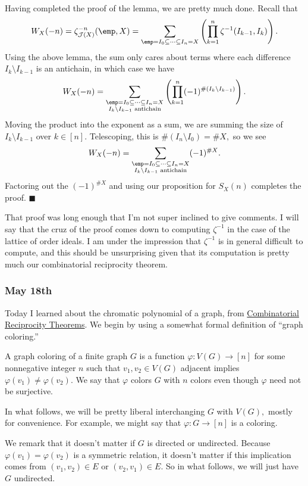 Having completed the proof of the lemma, we are pretty much done. Recall that
\[W_X(-n)=\zeta_{\mathcal J(X)}^{-n}(\emp,X)=\sum_{\emp=I_0\subseteq\cdots\subseteq I_n=X}\left(\prod_{k=1}^n\zeta^{-1}(I_{k-1},I_k)\right).\]
Using the above lemma, the sum only cares about terms where each difference $I_k\setminus I_{k-1}$ is an antichain, in which case we have
\[W_X(-n)=\sum_{\substack{\emp=I_0\subseteq\cdots\subseteq I_n=X\\I_k\setminus I_{k-1}\text{ antichain}}}\left(\prod_{k=1}^n(-1)^{\#(I_k\setminus I_{k-1})}\right).\]
Moving the product into the exponent as a sum, we are summing the size of $I_k\setminus I_{k-1}$ over $k\in[n].$ Telescoping, this is $\#(I_n\setminus I_0)=\#X,$ so we see
\[W_X(-n)=\sum_{\substack{\emp=I_0\subseteq\cdots\subseteq I_n=X\\I_k\setminus I_{k-1}\text{ antichain}}}(-1)^{\#X}.\]
Factoring out the $(-1)^{\#X}$ and using our proposition for $S_X(n)$ completes the proof. $\blacksquare$

That proof was long enough that I'm not super inclined to give comments. I will say that the cruz of the proof comes down to computing $\zeta^{-1}$ in the case of the lattice of order ideals. I am under the impression that $\zeta^{-1}$ is in general difficult to compute, and this should be unsurprising given that its computation is pretty much our combinatorial reciprocity theorem.

\subsubsection{May 18th}
Today I learned about the chromatic polynomial of a graph, from \href{https://web.archive.org/web/20201112023302/http://math.sfsu.edu/beck/papers/crt.pdf}{Combinatorial Reciprocity Theorems}. We begin by using a somewhat formal definition of ``graph coloring.''
\begin{definition}
    A graph coloring of a finite graph $G$ is a function $\varphi:V(G)\to[n]$ for some nonnegative integer $n$ such that $v_1,v_2\in V(G)$ adjacent implies $\varphi(v_1)\ne\varphi(v_2).$ We say that $\varphi$ colors $G$ with $n$ colors even though $\varphi$ need not be surjective.
\end{definition}
In what follows, we will be pretty liberal interchanging $G$ with $V(G),$ mostly for convenience. For example, we might say that $\varphi:G\to[n]$ is a coloring.

We remark that it doesn't matter if $G$ is directed or undirected. Because $\varphi(v_1)=\varphi(v_2)$ is a symmetric relation, it doesn't matter if this implication comes from $(v_1,v_2)\in E$ or $(v_2,v_1)\in E.$ So in what follows, we will just have $G$ undirected.

